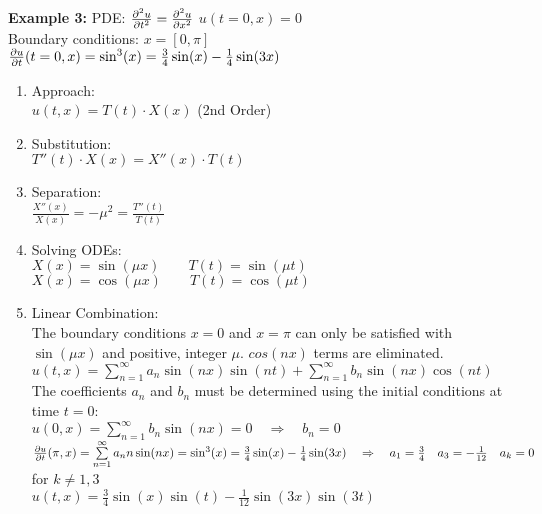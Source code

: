 \hfill
\begin{minipage}{0.49\textwidth}
\textbf{Example 3: }PDE: $\frac{\partial ^2u}{\partial t^2}=\frac{\partial ^2u}{\partial x^2}$ \quad $u(t=0,x)=0$\\
Boundary conditions: $x=[0,\pi]$ \\
\qquad\qquad $\frac{\partial u}{\partial t}(t=0,x)=\sin^3(x)=\frac34\sin(x)-\frac14\sin(3x)$
\begin{enumerate}
	\item Approach:\\[0.4cm]
	$u(t,x)=T(t) \cdot X(x) $ (2nd Order)
	\item Substitution:\\[0.4cm]
	$T''(t)\cdot X(x) = X''(x)\cdot T(t)$
	\item Separation:\\[0.4cm]
	$\frac{X''(x)}{X(x)}= -\mu^2=\frac{T''(t)}{T(t)}$
	\item Solving ODEs:\\[0.4cm]
		$X(x)=\sin(\mu x) \qquad T(t)=\sin(\mu t)$\\
		$X(x)=\cos(\mu x) \qquad T(t)=\cos(\mu t)$
	\item Linear Combination:\\[0.4cm]
		The boundary conditions $x=0$ and $x=\pi$ can only be satisfied with $\sin(\mu x) $ and positive, integer $\mu$. $cos(nx)$ terms are eliminated.\\[0.4cm]
		$u(t,x)=\sum\limits_{n=1}^{\infty}{a_n\sin(nx)\sin(nt)} + \sum\limits_{n=1}^{\infty}{b_n\sin(nx)\cos(nt)}$\\[0.4cm]
		The coefficients $a_n$ and $b_n$ must be determined using the initial conditions at time $t=0$:\\[0.4cm]
		$u(0,x)=\sum\limits_{n=1}^{\infty}{b_n\sin(nx)}=0 \quad\Rightarrow\quad b_n=0$\\[0.2cm]
		$\frac{\partial u}{\partial t}(\pi,x)=\sum\limits_{n=1}^{\infty}{a_nn\sin(nx)}=\sin^3(x)=\frac34\sin(x)-\frac14\sin(3x) \quad\Rightarrow\quad a_1=\frac34 \quad a_3=-\frac{1}{12}\quad a_k=0$ for $k\neq 1,3$\\[0.4cm]
		$u(t,x)=\frac34\sin(x)\sin(t)-\frac1{12}\sin(3x)\sin(3t)$
\end{enumerate}
\end{minipage}
